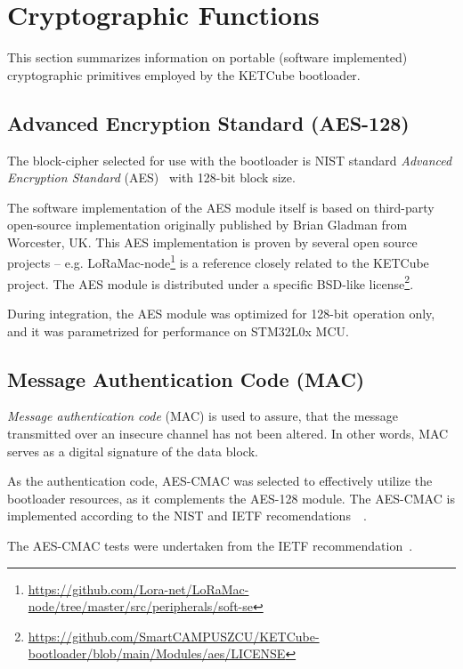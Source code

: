 \clearpage
\section{Cryptographic Functions}
This section summarizes information on portable (software implemented) cryptographic primitives employed by the KETCube bootloader.

\subsection{Advanced Encryption Standard (AES-128)}

The block-cipher selected for use with the bootloader is NIST standard \textit{Advanced Encryption Standard} (AES)~\cite{NIST:AES} with 128-bit block size. 

The software implementation of the AES module itself is based on third-party open-source implementation originally published by Brian Gladman from Worcester, UK.  This AES implementation is proven by several open source projects -- e.g. LoRaMac-node\footnote{\url{https://github.com/Lora-net/LoRaMac-node/tree/master/src/peripherals/soft-se}} is a reference closely related to the KETCube project. The AES module is distributed under a specific BSD-like license\footnote{\url{https://github.com/SmartCAMPUSZCU/KETCube-bootloader/blob/main/Modules/aes/LICENSE}}.

During integration, the AES module was optimized for 128-bit operation only, and it was parametrized for performance on STM32L0x MCU.



\subsection{Message Authentication Code (MAC)}

\textit{Message authentication code} (MAC) is used to assure, that the message transmitted over an insecure channel has not been altered. In other words, MAC serves as a digital signature of the data block.

As the authentication code, AES-CMAC was selected to effectively utilize the bootloader resources, as it complements the AES-128 module. The AES-CMAC is implemented according to the NIST and IETF recomendations~\cite{NIST:AES-CMAC}~\cite{IETF:AES-CMAC}. 

The AES-CMAC tests were undertaken from the IETF recommendation~\cite{IETF:AES-CMAC}.

